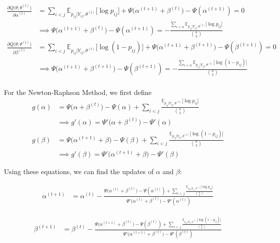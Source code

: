 \documentclass{article}
\begin{document}
\begin{align*}
\frac{\partial Q\big(\theta; \theta^{(t)}\big)}{\partial \alpha^{(t)}} &= \sum_{i<j} \mathbb{E}_{p_{ij} | Y_{ij}, \theta^{(t)}} \big[\log p_{ij}\big] + \Psi\Big(\alpha^{(t+1)} + \beta^{(t)}\Big) - \Psi(\alpha^{(t+1)})= 0 \\
&\implies \Psi\Big(\alpha^{(t+1)} + \beta^{(t)}\Big) - \Psi(\alpha^{(t+1)}) = -\frac{\sum_{i<n}\mathbb{E}_{p_{ij} | Y_{ij}, \theta^{(t)}} \big[\log p_{ij}\big]}{{n \choose 2}} \tag{M1} \\
\frac{\partial Q\big(\theta; \theta^{(t)}\big)}{\partial \beta^{(t)}} &= \sum_{i<j} \mathbb{E}_{p_{ij} | Y_{ij}, \theta^{(t)}} \big[\log (1- p_{ij})\big] + \Psi\Big(\alpha^{(t+1)} + \beta^{(t+1)}\Big) - \Psi(\beta^{(t+1)}) = 0 \\
&\implies \Psi\Big(\alpha^{(t+1)} + \beta^{(t+1)}\Big) - \Psi(\beta^{(t+1)}) = -\frac{\sum_{i<n}\mathbb{E}_{p_{ij} | Y_{ij}, \theta^{(t)}} \big[\log (1 - p_{ij})\big]}{{n \choose 2}} \tag{M2} \\
\end{align*}

For the Newton-Raphson Method, we first define 
\begin{align*}
g(\alpha) &= \Psi \big(\alpha + \beta^{(t)} \big) - \Psi(\alpha) + \sum_{i < j}\frac{ \mathbb{E}_{p_{ij} | Y_{ij}, \theta^{(t)}} \big[\log p_{ij}\big] }{{n \choose 2}} \\
&\implies g'(\alpha) = \Psi' \big(\alpha + \beta^{(t)} \big) - \Psi'(\alpha) \\
g(\beta) &= \Psi \big(\alpha^{(t+1)} + \beta \big) - \Psi(\beta) + \sum_{i < j}\frac{ \mathbb{E}_{p_{ij} | Y_{ij}, \theta^{(t)}} \big[\log (1- p_{ij})\big] }{{n \choose 2}} \\
&\implies g'(\beta) = \Psi' \big(\alpha^{(t+1)}  + \beta\big) - \Psi'(\beta)
\end{align*}

Using these equations, we can find the updates of $\alpha$ and $\beta$:

\begin{align*}
\alpha^{(t+1)} &= \alpha^{(t)} - \frac{\Psi\big(\alpha^{(t)} + \beta^{(t)}\big) - \Psi(\alpha^{(t)}) + \sum_{i < j}\frac{ \mathbb{E}_{p_{ij} | Y_{ij}, \theta^{(t)}} \big[\log p_{ij}\big] }{{n \choose 2}}}{\Psi'\big(\alpha^{(t)} + \beta^{(t)}\big) - \Psi'(\alpha^{(t)})} \tag{$\alpha$}
\end{align*}

\begin{align*}
\beta^{(t+1)} &= \beta^{(t)} - \frac{\Psi\big(\alpha^{(t+1)} + \beta^{(t)}\big) - \Psi(\beta^{(t)}) + \sum_{i < j}\frac{ \mathbb{E}_{p_{ij} | Y_{ij}, \theta^{(t)}} \big[\log (1- p_{ij})\big] }{{n \choose 2}}}{\Psi'\big(\alpha^{(t+1)} + \beta^{(t)}\big) - \Psi'(\beta^{(t)})} \tag{$\beta$}
\end{align*}
\end{document}
